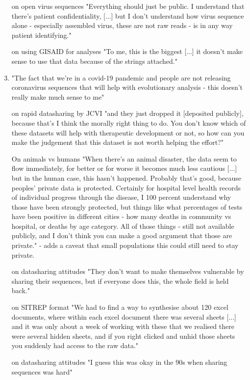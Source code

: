 \begin{enumerate}
\item [on open virus sequences] "Everything should just be public. I understand that there's patient confidentiality, [...] but I don't understand how virus sequence alone - especially assembled virus, these are not raw reads - is in any way patient identifying."
\item [on using GISAID for analyses] "To me, this is the biggest [...] it doesn't make sense to use that data because of the strings attached."
\item "The fact that we're in a covid-19 pandemic and people are not releasing coronavirus sequences that will help with evolutionary analysis - this doesn't really make much sense to me"
\item [on rapid datasharing by JCVI] "and they just dropped it [deposited publicly], because that's I think the morally right thing to do. You don't know which of these datasets will help with therapeutic development or not, so how can you make the judgement that this dataset is not worth helping the effort?"
\item [On animals vs humans] "When there's an animal disaster, the data seem to flow immediately, for better or for worse it becomes much less cautious [...] but in the human case, this hasn't happened. Probably that's good, because peoples' private data is protected. Certainly for hospital level health records of individual progress through the disease, I 100 percent understand why those have been strongly protected, but things like what percentages of tests have been positive in different cities - how many deaths in community vs hospital, or deaths by age category. All of those things - still not available publicly, and I don't think you can make a good argument that those are private." - adds a caveat that small populations this could still need to stay private.
\item [on datasharing attitudes] "They don't want to make themselves vulnerable by sharing their sequences, but if everyone does this, the whole field is held back."
\item [on SITREP format] "We had to find a way to synthesise about 120 excel documents, where within each excel document there was several sheets [...] and it was only about a week of working with these that we realised there were several hidden sheets, and if you right clicked and unhid those sheets you suddenly had access to the raw data."
\item  [on datasharing attitudes] "I guess this was okay in the 90s when sharing sequences was hard"

\end{enumerate}
